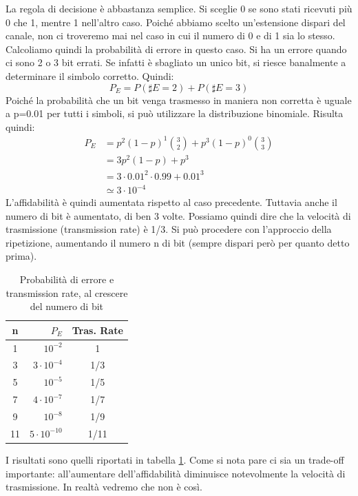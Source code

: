 La regola di decisione è abbastanza semplice. Si sceglie 0 se sono stati ricevuti più 0 che 1, mentre 1 nell'altro caso.
Poiché abbiamo scelto un'estensione dispari del canale, non ci troveremo mai nel caso in cui il numero di 0 e di 1 sia lo stesso.
Calcoliamo quindi la probabilità di errore in questo caso. Si ha un errore quando ci sono 2 o 3 bit errati. Se infatti è sbagliato 
un unico bit, si riesce banalmente a determinare il simbolo corretto. Quindi:
\[
 P_E=P(\sharp E=2)+P(\sharp E=3)
\]
Poiché la probabilità che un bit venga trasmesso in maniera non corretta è uguale a p=0.01 per tutti i simboli, si può utilizzare 
la distribuzione binomiale. Risulta quindi:
\[\begin{split}
 P_E&=p^2(1-p)^1 \binom{3}{2} + p^3(1-p)^0 \binom{3}{3} \\
    &=3p^2(1-p) +p^3 \\
    &=3 \cdot 0.01^2 \cdot 0.99 + 0.01^3 \\
    &\simeq 3 \cdot 10^{-4}
  \end{split}
\]
L'affidabilità è quindi aumentata rispetto al caso precedente. Tuttavia anche il numero di bit è aumentato, di ben 3 volte.
Possiamo quindi dire che la velocità di trasmissione (transmission rate) è 1/3. Si può procedere con l'approccio della ripetizione, aumentando il numero n di bit (sempre dispari però per quanto detto prima).

\begin{table}[htbp]
  \begin{center}
   \begin{tabular}{c | r | c}
        n & $P_E$ & Tras. Rate \\
        \hline
	1 & $10^{-2}$ & 1 \\
        3 & $3 \cdot 10^{-4}$ & 1/3 \\
        5 & $10^{-5}$ & 1/5 \\
        7 & $4 \cdot 10^{-7}$ & 1/7 \\
        9 & $10^{-8}$ & 1/9 \\
       11 & $5 \cdot 10^{-10}$ & 1/11 \\
    \end{tabular}
  \end{center}
\caption{Probabilità di errore e transmission rate, al crescere del numero di bit}
\label{tab:bscc}
\end{table}

I risultati sono quelli riportati in tabella \ref{tab:bscc}. Come si nota pare ci sia un trade-off importante: all'aumentare dell'affidabilità diminuisce notevolmente la velocità di trasmissione.
In realtà vedremo che non è così.

